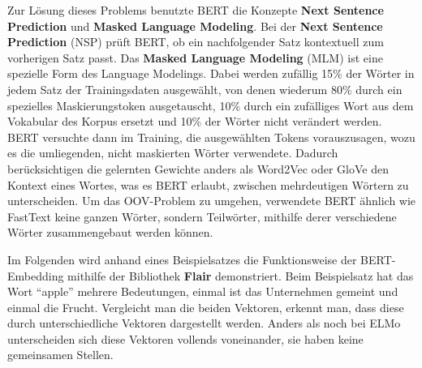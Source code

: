 \documentclass[11pt]{article}
\begin{document}
Zur Lösung dieses Problems benutzte BERT die Konzepte \textbf{Next
Sentence Prediction} und \textbf{Masked Language Modeling}. Bei der
\textbf{Next Sentence Prediction} (NSP) prüft BERT, ob ein nachfolgender
Satz kontextuell zum vorherigen Satz passt. Das \textbf{Masked Language
Modeling} (MLM) ist eine spezielle Form des Language Modelings. Dabei
werden zufällig 15\% der Wörter in jedem Satz der Trainingsdaten
ausgewählt, von denen wiederum 80\% durch ein spezielles
Maskierungstoken ausgetauscht, 10\% durch ein zufälliges Wort aus dem
Vokabular des Korpus ersetzt und 10\% der Wörter nicht verändert werden.
BERT versuchte dann im Training, die ausgewählten Tokens vorauszusagen,
wozu es die umliegenden, nicht maskierten Wörter verwendete. Dadurch
berücksichtigen die gelernten Gewichte anders als Word2Vec oder GloVe
den Kontext eines Wortes, was es BERT erlaubt, zwischen mehrdeutigen
Wörtern zu unterscheiden. Um das OOV-Problem zu umgehen, verwendete BERT
ähnlich wie FastText keine ganzen Wörter, sondern Teilwörter, mithilfe
derer verschiedene Wörter zusammengebaut werden können.

Im Folgenden wird anhand eines Beispielsatzes die Funktionsweise der
BERT-Embedding mithilfe der Bibliothek \textbf{Flair} demonstriert. Beim
Beispielsatz hat das Wort ``apple'' mehrere Bedeutungen, einmal ist das
Unternehmen gemeint und einmal die Frucht. Vergleicht man die beiden
Vektoren, erkennt man, dass diese durch unterschiedliche Vektoren
dargestellt werden. Anders als noch bei ELMo unterscheiden sich diese
Vektoren vollends voneinander, sie haben keine gemeinsamen Stellen.
\end{document}
